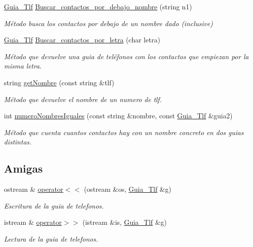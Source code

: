 \begin{DoxyCompactItemize}
\item 
\hyperlink{classGuia__Tlf}{Guia\+\_\+\+Tlf} \hyperlink{classGuia__Tlf_ab6b614acc6421415f8ac37b473855243}{Buscar\+\_\+contactos\+\_\+por\+\_\+debajo\+\_\+nombre} (string n1)
\begin{DoxyCompactList}\small\item\em Método busca los contactos por debajo de un nombre dado (inclusive) \end{DoxyCompactList}\item 
\hyperlink{classGuia__Tlf}{Guia\+\_\+\+Tlf} \hyperlink{classGuia__Tlf_af47c1b9b812dc15f138989472e430515}{Buscar\+\_\+contactos\+\_\+por\+\_\+letra} (char letra)
\begin{DoxyCompactList}\small\item\em Método que devuelve una guia de teléfonos con los contactos que empiezan por la misma letra. \end{DoxyCompactList}\item 
string \hyperlink{classGuia__Tlf_ae01b5aba74b7ed5b05f9cb200f134b08}{get\+Nombre} (const string \&tlf)
\begin{DoxyCompactList}\small\item\em Método que devuelve el nombre de un numero de tlf. \end{DoxyCompactList}\item 
int \hyperlink{classGuia__Tlf_a43c5d8b5c8e1dbb7add384222995cdaf}{numero\+Nombres\+Iguales} (const string \&nombre, const \hyperlink{classGuia__Tlf}{Guia\+\_\+\+Tlf} \&guia2)
\begin{DoxyCompactList}\small\item\em Método que cuenta cuantos contactos hay con un nombre concreto en dos guias distintas. \end{DoxyCompactList}\end{DoxyCompactItemize}
\subsection*{Amigas}
\begin{DoxyCompactItemize}
\item 
ostream \& \hyperlink{classGuia__Tlf_a73eb02557f3118999710c66aa9ecf309}{operator$<$$<$} (ostream \&os, \hyperlink{classGuia__Tlf}{Guia\+\_\+\+Tlf} \&g)
\begin{DoxyCompactList}\small\item\em Escritura de la guia de telefonos. \end{DoxyCompactList}\item 
istream \& \hyperlink{classGuia__Tlf_ac15a5b0c2eb7d5b1843f11beb492495e}{operator$>$$>$} (istream \&is, \hyperlink{classGuia__Tlf}{Guia\+\_\+\+Tlf} \&g)
\begin{DoxyCompactList}\small\item\em Lectura de la guia de telefonos. \end{DoxyCompactList}\end{DoxyCompactItemize}


